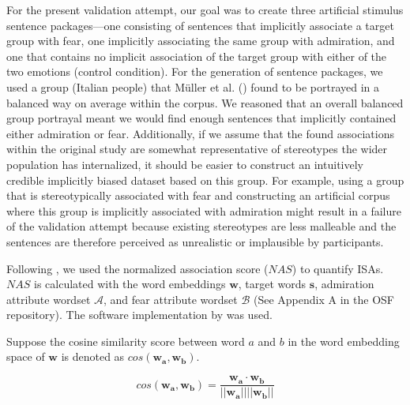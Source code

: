 For the present validation attempt, our goal was to create three artificial stimulus sentence packages---one consisting of sentences that implicitly associate a target group with fear, one implicitly associating the same group with admiration, and one that contains no implicit association of the target group with either of the two emotions (control condition). For the generation of sentence packages, we used a group (Italian people) that Müller et al. (\citeyear{mueller:2023:DRN}) found to be portrayed in a balanced way on average within the corpus. We reasoned that an overall balanced group portrayal meant we would find enough sentences that implicitly contained either admiration or fear. Additionally, if we assume that the found associations within the original study are somewhat representative of stereotypes the wider population has internalized, it should be easier to construct an intuitively credible implicitly biased dataset based on this group. For example, using a group that is stereotypically associated with fear and constructing an artificial corpus where this group is implicitly associated with admiration might result in a failure of the validation attempt because existing stereotypes are less malleable and the sentences are therefore perceived as unrealistic or implausible by participants.

Following \textcite{mueller:2023:DRN,urman:2022:F}, we used the normalized association score ($NAS$) \parencite{caliskan:2017:S} to quantify ISAs. $NAS$ is calculated with the word embeddings $\boldsymbol{w}$, target words $\boldsymbol{s}$, admiration attribute wordset $\mathcal{A}$, and fear attribute wordset $\mathcal{B}$ (See Appendix A in the OSF repository). The software implementation by \textcite{chan:2022} was used.


Suppose the cosine similarity score between word $a$ and $b$ in the word embedding space of $\boldsymbol{w}$ is denoted as $cos(\boldsymbol{w_a}, \boldsymbol{w_b})$.

\begin{equation}
cos(\boldsymbol{w_a}, \boldsymbol{w_b}) = \frac{\boldsymbol{w_a} \cdot \boldsymbol{w_b}}{ || \boldsymbol{w_a} || || \boldsymbol{w_b} ||}
\end{equation}

